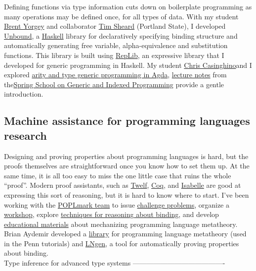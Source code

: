 \documentclass[]{article}
\begin{document}
Defining functions via type information cuts down on boilerplate
programming as many operations may be defined once, for all types of
data. With my student \href{http://www.cis.upenn.edu/\%7Ebyorgey/}{Brent
Yorgey} and collaborator \href{http://web.cecs.pdx.edu/\%7Esheard/}{Tim
Sheard} (Portland State), I developed
\href{http://hackage.haskell.org/package/unbound/}{Unbound}, a
\href{http://www.haskell.org/ghc/}{Haskell} library for declaratively
specifying binding structure and automatically generating free variable,
alpha-equivalence and substitution functions. This library is built
using \href{http://hackage.haskell.org/package/RepLib/}{RepLib}, an
expressive library that I developed for generic programming in Haskell.
My student \href{http://www.seas.upenn.edu/\%7Eccasin/}{Chris
Casinghino}and I explored
\href{http://www.seas.upenn.edu/\%7Esweirich/papers/aritygen.pdf}{arity
and type generic programming in Agda},
\href{http://www.seas.upenn.edu/\%7Esweirich/ssgip/}{lecture notes} from
the\href{http://www.comlab.ox.ac.uk/projects/gip/school.html}{Spring
School on Generic and Indexed Programming} provide a gentle
introduction.\\

\subsection{Machine assistance for programming languages research}

Designing and proving properties about programming languages is hard,
but the proofs themselves are straightforward once you know how to set
them up. At the same time, it is all too easy to miss the one little
case that ruins the whole ``proof''. Modern proof assistants, such as
\href{http://www.cs.cmu.edu/\%7Etwelf/}{Twelf},
\href{http://coq.inria.fr/}{Coq}, and
\href{http://www.cl.cam.ac.uk/Research/HVG/Isabelle/}{Isabelle} are good
at expressing this sort of reasoning, but it is hard to know where to
start. I've been working with the
\href{http://www.cis.upenn.edu/proj/plclub/mmm/}{POPLmark team} to issue
\href{http://www.cis.upenn.edu/proj/plclub/mmm/}{challenge problems},
organize a \href{http://www.seas.upenn.edu/\%7Esweirich/wmm/}{workshop},
explore
\href{http://www.seas.upenn.edu/\%7Esweirich/papers/nominal-coq/}{techniques
for reasoning about binding}, and develop
\href{http://www.seas.upenn.edu/\%7Esweirich/cis700/f06/}{educational
materials} about mechanizing programming language metatheory. Brian
Aydemir developed a
\href{http://www.cis.upenn.edu/\%7Eplclub/metalib/}{library} for
programming language metatheory (used in the Penn tutorials) and
\href{http://www.cis.upenn.edu/\%7Ebaydemir/papers/lngen/}{LNgen}, a
tool for automatically proving properties about binding.\\ Type
inference for advanced type systems
----------------------------------------
\end{document}
